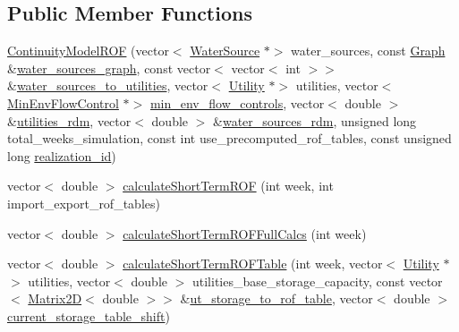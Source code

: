 \subsection*{Public Member Functions}
\begin{DoxyCompactItemize}
\item 
\mbox{\hyperlink{classContinuityModelROF_a23bd422349e4e2246bd44b2007564fd1}{Continuity\+Model\+R\+OF}} (vector$<$ \mbox{\hyperlink{classWaterSource}{Water\+Source}} $\ast$$>$ water\+\_\+sources, const \mbox{\hyperlink{classGraph}{Graph}} \&\mbox{\hyperlink{classContinuityModel_a563401588c6fa622f03393909a3522db}{water\+\_\+sources\+\_\+graph}}, const vector$<$ vector$<$ int $>$$>$ \&\mbox{\hyperlink{classContinuityModel_ae8516bcbbf52650190277fc8b06c1843}{water\+\_\+sources\+\_\+to\+\_\+utilities}}, vector$<$ \mbox{\hyperlink{classUtility}{Utility}} $\ast$$>$ utilities, vector$<$ \mbox{\hyperlink{classMinEnvFlowControl}{Min\+Env\+Flow\+Control}} $\ast$$>$ \mbox{\hyperlink{classContinuityModel_afc991e5c0d144020e49a97751a04b302}{min\+\_\+env\+\_\+flow\+\_\+controls}}, vector$<$ double $>$ \&\mbox{\hyperlink{classContinuityModel_aa4a00b76da6295d2faa11e3dcaea1896}{utilities\+\_\+rdm}}, vector$<$ double $>$ \&\mbox{\hyperlink{classContinuityModel_ab7b8fa93a6f56b328e425e1ead6cfefa}{water\+\_\+sources\+\_\+rdm}}, unsigned long total\+\_\+weeks\+\_\+simulation, const int use\+\_\+precomputed\+\_\+rof\+\_\+tables, const unsigned long \mbox{\hyperlink{classContinuityModel_a7b6c99bf256f6c6b633ebb78282f43c7}{realization\+\_\+id}})
\item 
vector$<$ double $>$ \mbox{\hyperlink{classContinuityModelROF_a927597ce427aa9a9f65719bccbfba623}{calculate\+Short\+Term\+R\+OF}} (int week, int import\+\_\+export\+\_\+rof\+\_\+tables)
\item 
vector$<$ double $>$ \mbox{\hyperlink{classContinuityModelROF_afcf6c32935729d64dc2fdc021241c5e9}{calculate\+Short\+Term\+R\+O\+F\+Full\+Calcs}} (int week)
\item 
vector$<$ double $>$ \mbox{\hyperlink{classContinuityModelROF_acd0dd0324718521f49eb344dbba6684d}{calculate\+Short\+Term\+R\+O\+F\+Table}} (int week, vector$<$ \mbox{\hyperlink{classUtility}{Utility}} $\ast$$>$ utilities, vector$<$ double $>$ utilities\+\_\+base\+\_\+storage\+\_\+capacity, const vector$<$ \mbox{\hyperlink{classMatrix2D}{Matrix2D}}$<$ double $>$$>$ \&\mbox{\hyperlink{classContinuityModelROF_ada25d241caf860255ad00097f5e7adb6}{ut\+\_\+storage\+\_\+to\+\_\+rof\+\_\+table}}, vector$<$ double $>$ \mbox{\hyperlink{classContinuityModelROF_a443efa8d5a8bcbb1fea1a0bc929c77cd}{current\+\_\+storage\+\_\+table\+\_\+shift}})

\end{DoxyCompactItemize}

